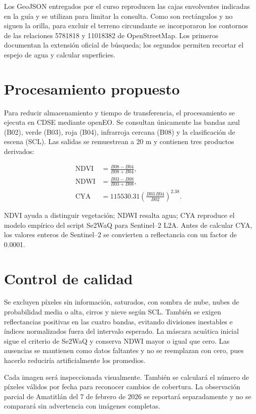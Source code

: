 \documentclass[11pt,letterpaper]{article}
\begin{document}
Los GeoJSON entregados por el curso reproducen las cajas envolventes indicadas en la guía y se utilizan para limitar la consulta. Como son rectángulos y no siguen la orilla, para excluir el terreno circundante se incorporaron los contornos de las relaciones 5781818 y 11018382 de OpenStreetMap. Los primeros documentan la extensión oficial de búsqueda; los segundos permiten recortar el espejo de agua y calcular superficies.

\section{Procesamiento propuesto}

Para reducir almacenamiento y tiempo de transferencia, el procesamiento se ejecuta en CDSE mediante openEO. Se consultan únicamente las bandas azul (B02), verde (B03), roja (B04), infrarroja cercana (B08) y la clasificación de escena (SCL). Las salidas se remuestrean a 20 m y contienen tres productos derivados:

\begin{align}
\mathrm{NDVI} &= \frac{B08-B04}{B08+B04}, \\
\mathrm{NDWI} &= \frac{B03-B08}{B03+B08}, \\
\mathrm{CYA} &= 115530.31\left(\frac{B03\,B04}{B02}\right)^{2.38}.
\end{align}

NDVI ayuda a distinguir vegetación; NDWI resalta agua; CYA reproduce el modelo empírico del script Se2WaQ para Sentinel--2 L2A. Antes de calcular CYA, los valores enteros de Sentinel--2 se convierten a reflectancia con un factor de 0.0001.

\section{Control de calidad}

Se excluyen píxeles sin información, saturados, con sombra de nube, nubes de probabilidad media o alta, cirros y nieve según SCL. También se exigen reflectancias positivas en las cuatro bandas, evitando divisiones inestables e índices normalizados fuera del intervalo esperado. La máscara acuática inicial sigue el criterio de Se2WaQ y conserva NDWI mayor o igual que cero. Las ausencias se mantienen como datos faltantes y no se reemplazan con cero, pues hacerlo reduciría artificialmente los promedios.

Cada imagen será inspeccionada visualmente. También se calculará el número de píxeles válidos por fecha para reconocer cambios de cobertura. La observación parcial de Amatitlán del 7 de febrero de 2026 se reportará separadamente y no se comparará sin advertencia con imágenes completas.
\end{document}

